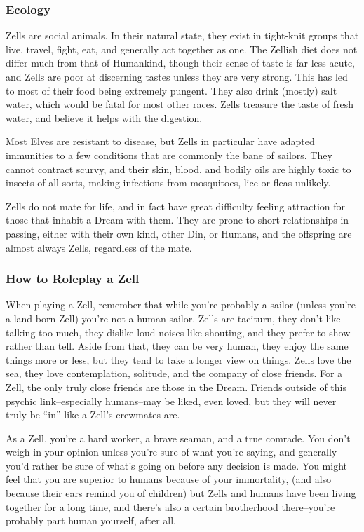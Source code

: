 \documentclass[oneside,11pt,english]{book}
\begin{document}
\subsubsection*{Ecology} 
Zells are social animals. In their natural state, they exist in tight-knit groups that live, travel, fight, eat, and 
generally act together as one. The Zellish diet does not differ much from that of Humankind, though their 
sense of taste is far less acute, and Zells are poor at discerning tastes unless they are very strong. This has 
led to most of their food being extremely pungent. They also drink (mostly) salt water, which would be 
fatal for most other races. Zells treasure the taste of fresh water, and believe it helps with the digestion. 

Most Elves are resistant to disease, but Zells in particular have adapted immunities to a few conditions 
that are commonly the bane of sailors. They cannot contract scurvy, and their skin, blood, and bodily oils 
are highly toxic to insects of all sorts, making infections from mosquitoes, lice or fleas unlikely. 

Zells do not mate for life, and in fact have great difficulty feeling attraction for those that inhabit a Dream 
with them. They are prone to short relationships in passing, either with their own kind, other Din, or 
Humans, and the offspring are almost always Zells, regardless of the mate. 

\subsubsection{How to Roleplay a Zell}
When playing a Zell, remember that while you’re probably a sailor (unless you’re a land-born Zell) 
you’re not a human sailor. Zells are taciturn, they don’t like talking too much, they dislike loud noises 
like shouting, and they prefer to show rather than tell. Aside from that, they can be very human, they 
enjoy the same things more or less, but they tend to take a longer view on things. Zells love the sea, they 
love contemplation, solitude, and the company of close friends. For a Zell, the only truly close friends are 
those in the Dream. Friends outside of this psychic link--especially humans--may be liked, even loved, 
but they will never truly be “in” like a Zell’s crewmates are.

As a Zell, you’re a hard worker, a brave seaman, and a true comrade. You don’t weigh in your opinion unless you’re sure of what you’re saying, 
and generally you’d rather be sure of what’s going on before any decision is made. You might feel that 
you are superior to humans because of your immortality, (and also because their ears remind you of 
children) but Zells and humans have been living together for a long time, and there’s also a certain 
brotherhood there--you’re probably part human yourself, after all. 
\end{document}
